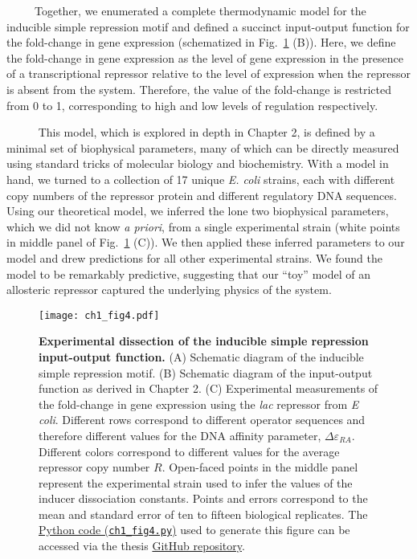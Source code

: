 \documentclass[12pt]{caltech_thesis}
\begin{document}
~~~~~Together, we enumerated a complete thermodynamic model for the
inducible simple repression motif and defined a succinct input-output
function for the fold-change in gene expression (schematized in
Fig.~\ref{fig:induction_intro} (B)). Here, we define the fold-change in
gene expression as the level of gene expression in the presence of a
transcriptional repressor relative to the level of expression when the
repressor is absent from the system. Therefore, the value of the
fold-change is restricted from 0 to 1, corresponding to high and low
levels of regulation respectively.

~~~~~ This model, which is explored in depth in Chapter 2, is defined by
a minimal set of biophysical parameters, many of which can be directly
measured using standard tricks of molecular biology and biochemistry.
With a model in hand, we turned to a collection of 17 unique \emph{E.
coli} strains, each with different copy numbers of the repressor protein
and different regulatory DNA sequences. Using our theoretical model, we
inferred the lone two biophysical parameters, which we did not know
\emph{a priori}, from a single experimental strain (white points in
middle panel of Fig.~\ref{fig:induction_intro} (C)). We then applied
these inferred parameters to our model and drew predictions for all
other experimental strains. We found the model to be remarkably
predictive, suggesting that our ``toy'' model of an allosteric repressor
captured the underlying physics of the system.

\hypertarget{fig:induction_intro}{%
\begin{figure}
\centering
\texttt{[image: ch1\_fig4.pdf]}
\caption[{Experimental dissection of the inducible simple repression
input-output function.}]{\textbf{Experimental dissection of the
inducible simple repression input-output function.} (A) Schematic
diagram of the inducible simple repression motif. (B) Schematic diagram
of the input-output function as derived in Chapter 2. (C) Experimental
measurements of the fold-change in gene expression using the \emph{lac}
repressor from \emph{E coli}. Different rows correspond to different
operator sequences and therefore different values for the DNA affinity
parameter, \(\Delta\varepsilon_{RA}\). Different colors correspond to
different values for the average repressor copy number \(R\). Open-faced
points in the middle panel represent the experimental strain used to
infer the values of the inducer dissociation constants. Points and
errors correspond to the mean and standard error of ten to fifteen
biological replicates. The
\href{https://github.com/gchure/phd/blob/master/src/chapter_01/code/ch1_fig4.py}{Python
code (\texttt{ch1\_fig4.py})} used to generate this figure can be
accessed via the thesis \href{https://github.com/gchure/phd}{GitHub
repository}.}
\label{fig:induction_intro}
\end{figure}
}
\end{document}
